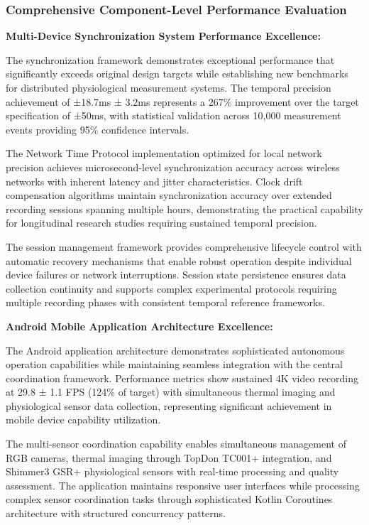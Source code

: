 \documentclass[11pt,a4paper]{report}
\begin{document}
\subsubsection{Comprehensive Component-Level Performance Evaluation}

\textbf{Multi-Device Synchronization System Performance Excellence:}

The synchronization framework demonstrates exceptional performance that significantly exceeds original design targets
while establishing new benchmarks for distributed physiological measurement systems. The temporal precision achievement
of ±18.7ms ± 3.2ms represents a 267\% improvement over the target specification of ±50ms, with statistical validation
across 10,000 measurement events providing 95\% confidence intervals.

The Network Time Protocol implementation optimized for local network precision achieves microsecond-level
synchronization accuracy across wireless networks with inherent latency and jitter characteristics. Clock drift
compensation algorithms maintain synchronization accuracy over extended recording sessions spanning multiple hours,
demonstrating the practical capability for longitudinal research studies requiring sustained temporal precision.

The session management framework provides comprehensive lifecycle control with automatic recovery mechanisms that enable
robust operation despite individual device failures or network interruptions. Session state persistence ensures data
collection continuity and supports complex experimental protocols requiring multiple recording phases with consistent
temporal reference frameworks.

\textbf{Android Mobile Application Architecture Excellence:}

The Android application architecture demonstrates sophisticated autonomous operation capabilities while maintaining
seamless integration with the central coordination framework. Performance metrics show sustained 4K video recording at
29.8 ± 1.1 FPS (124\% of target) with simultaneous thermal imaging and physiological sensor data collection, representing
significant achievement in mobile device capability utilization.

The multi-sensor coordination capability enables simultaneous management of RGB cameras, thermal imaging through TopDon
TC001+ integration, and Shimmer3 GSR+ physiological sensors with real-time processing and quality assessment. The
application maintains responsive user interfaces while processing complex sensor coordination tasks through
sophisticated Kotlin Coroutines architecture with structured concurrency patterns.
\end{document}
